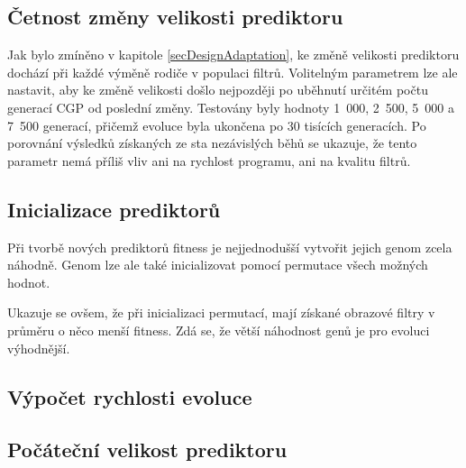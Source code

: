 \subsection{Četnost změny velikosti prediktoru}

Jak bylo zmíněno v kapitole \ref{secDesignAdaptation}, ke změně velikosti prediktoru dochází při každé výměně rodiče v populaci filtrů. Volitelným parametrem lze ale nastavit, aby ke změně velikosti došlo nejpozději po uběhnutí určitém počtu generací CGP od poslední změny. Testovány byly hodnoty 1~000, 2~500, 5~000 a 7~500 generací, přičemž evoluce byla ukončena po 30 tisících generacích. Po porovnání výsledků získaných ze sta nezávislých běhů se ukazuje, že tento parametr nemá příliš vliv ani na rychlost programu, ani na kvalitu filtrů.


\subsection{Inicializace prediktorů}

Při tvorbě nových prediktorů fitness je nejjednodušší vytvořit jejich genom zcela náhodně.  Genom lze ale také inicializovat pomocí permutace všech možných hodnot.

Ukazuje se ovšem, že při inicializaci permutací, mají získané obrazové filtry v průměru o něco menší fitness. Zdá se, že větší náhodnost genů je pro evoluci výhodnější.


\subsection{Výpočet rychlosti evoluce}


\subsection{Počáteční velikost prediktoru}



